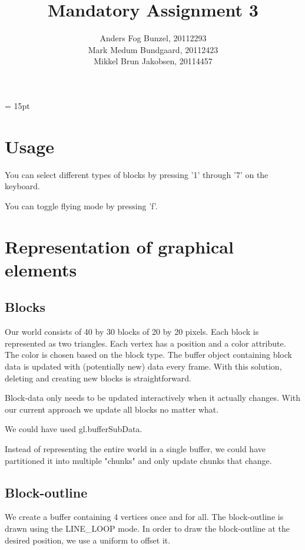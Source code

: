 \documentclass[12pt,leqno]{article}
\begin{document}
\title{Mandatory Assignment 3} 
\author{Anders Fog Bunzel, 20112293\\ Mark Medum Bundgaard, 20112423\\Mikkel Brun Jakobsen, 20114457}

\maketitle

\headheight = 15pt
\thispagestyle{fancy} 
\pagestyle{fancy} \lhead{
\date{\today}}   

\section{Usage}
You can select different types of blocks by pressing '1' through '7' on the keyboard.

You can toggle flying mode by pressing 'f'.

\section{Representation of graphical elements}

\subsection{Blocks}
Our world consists of 40 by 30 blocks of 20 by 20 pixels.
Each block is represented as two triangles.
Each vertex has a position and a color attribute. The color is chosen based on the block type.
The buffer object containing block data is updated with (potentially new) data every frame. With this solution, deleting and creating new blocks is straightforward.

Block-data only needs to be updated interactively when it actually changes. With our current approach we update all blocks no matter what.

We could have used gl.bufferSubData.

Instead of representing the entire world in a single buffer, we could have partitioned it into multiple "chunks" and only update chunks that change.

\subsection{Block-outline}
We create a buffer containing 4 vertices once and for all.
The block-outline is drawn using the LINE\_LOOP mode.
In order to draw the block-outline at the desired position, we use a uniform to offset it.
\end{document}
